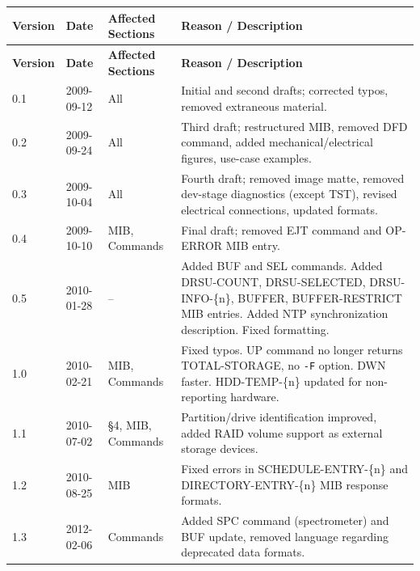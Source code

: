 
\changerecordheader

\begin{longtable}{|p{1.2cm}|p{2.5cm}|p{2.5cm}|p{8cm}|}
\hline
\textbf{Version} & \textbf{Date} & \textbf{Affected Sections} & \textbf{Reason / Description} \\
\hline
\endfirsthead

\hline
\textbf{Version} & \textbf{Date} & \textbf{Affected Sections} & \textbf{Reason / Description} \\
\hline
\endhead

\hline
\endfoot

0.1 & 2009-09-12 & All &
    Initial and second drafts; corrected typos, removed extraneous material. \\
\hline

0.2 & 2009-09-24 & All &
    Third draft; restructured MIB, removed DFD command, added mechanical/electrical
    figures, use-case examples. \\
\hline

0.3 & 2009-10-04 & All &
    Fourth draft; removed image matte, removed dev-stage diagnostics (except TST),
    revised electrical connections, updated formats. \\
\hline

0.4 & 2009-10-10 & MIB, Commands &
    Final draft; removed EJT command and OP-ERROR MIB entry. \\
\hline

0.5 & 2010-01-28 & -- &
    Added BUF and SEL commands.  Added DRSU-COUNT, DRSU-SELECTED, DRSU-INFO-\{n\},
    BUFFER, BUFFER-RESTRICT MIB entries.  Added NTP synchronization description.
    Fixed formatting. \\
\hline

1.0 & 2010-02-21 & MIB, Commands &
    Fixed typos.  UP command no longer returns TOTAL-STORAGE, no \texttt{-F} option.
    DWN faster.  HDD-TEMP-\{n\} updated for non-reporting hardware. \\
\hline

1.1 & 2010-07-02 & \S4, MIB, Commands &
    Partition/drive identification improved, added RAID volume support as external
    storage devices. \\
\hline

1.2 & 2010-08-25 & MIB &
    Fixed errors in SCHEDULE-ENTRY-\{n\} and DIRECTORY-ENTRY-\{n\} MIB response formats. \\
\hline

1.3 & 2012-02-06 & Commands &
    Added SPC command (spectrometer) and BUF update, removed language regarding
    deprecated data formats. \\
\hline


\end{longtable}
